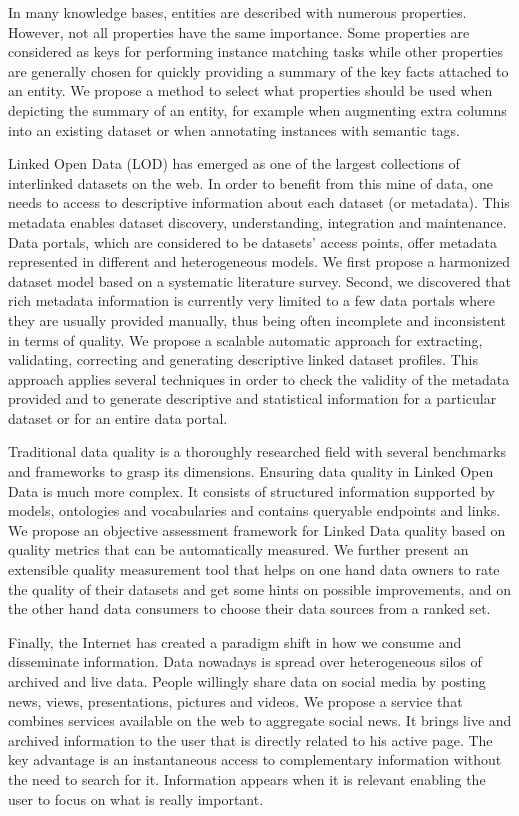 In many knowledge bases, entities are described with numerous properties. However, not all properties have the same importance. Some properties are considered as keys for performing instance matching tasks while other properties are generally chosen for quickly providing a summary of the key facts attached to an entity. We propose a method to select what properties should be used when depicting the summary of an entity, for example when augmenting extra columns into an existing dataset or when annotating instances with semantic tags.

Linked Open Data (LOD) has emerged as one of the largest collections of interlinked datasets on the web. In order to benefit from this mine of data, one needs to access to descriptive information about each dataset (or metadata). This metadata enables dataset discovery, understanding, integration and maintenance. Data portals, which are considered to be datasets' access points, offer metadata represented in different and heterogeneous models. We first propose a harmonized dataset model based on a systematic literature survey. Second, we discovered that rich metadata information is currently very limited to a few data portals where they are usually provided manually, thus being often incomplete and inconsistent in terms of quality. We propose a scalable automatic approach for extracting, validating, correcting and generating descriptive linked dataset profiles. This approach applies several techniques in order to check the validity of the metadata provided and to generate descriptive and statistical information for a particular dataset or for an entire data portal.

Traditional data quality is a thoroughly researched field with several benchmarks and frameworks to grasp its dimensions. Ensuring data quality in Linked Open Data is much more complex. It consists of structured information supported by models, ontologies and vocabularies and contains queryable endpoints and links. We propose an objective assessment framework for Linked Data quality based on quality metrics that can be automatically measured. We further present an extensible quality measurement tool that helps on one hand data owners to rate the quality of their datasets and get some hints on possible improvements, and on the other hand data consumers to choose their data sources from a ranked set.

Finally, the Internet has created a paradigm shift in how we consume and disseminate information. Data nowadays is spread over heterogeneous silos of archived and live data. People willingly share data on social media by posting news, views, presentations, pictures and videos. We propose a service that combines services available on the web to aggregate social news. It brings live and archived information to the user that is directly related to his active page. The key advantage is an instantaneous access to complementary information without the need to search for it. Information appears when it is relevant enabling the user to focus on what is really important.